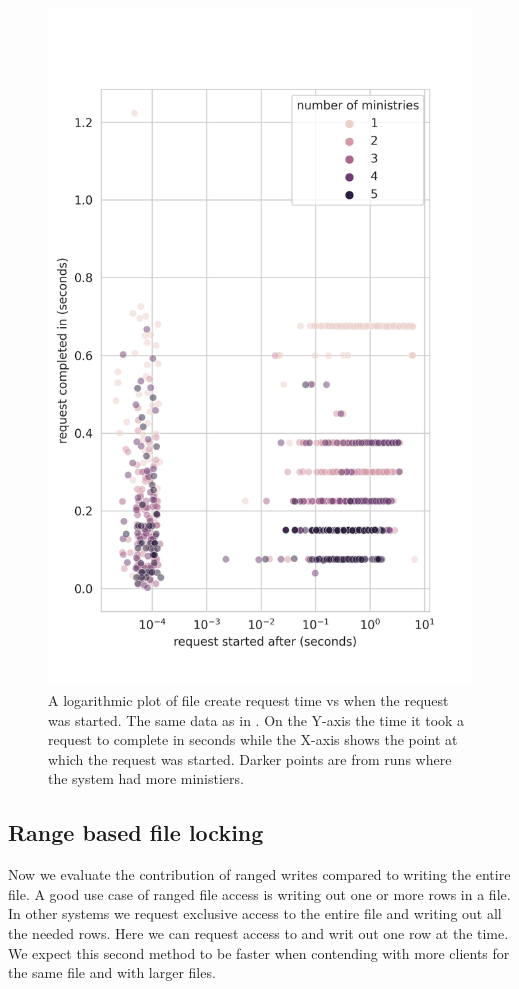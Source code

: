 \begin{figure}[bp]
	\centering
	\includegraphics[height=\textheight]{../results/plots/touch_vs_time.png}
	\caption{A logarithmic plot of file create request time vs when the request was started. The same data as in . On the Y-axis the time it took a request to complete in seconds while the X-axis shows the point at which the request was started. Darker points are from runs where the system had more ministiers.}
	\label{fig:touch_vs_time}
\end{figure}

\clearpage{}
\subsection{Range based file locking} \label{sec:res_range}
Now we evaluate the contribution of ranged writes compared to writing the entire file. A good use case of ranged file access is writing out one or more rows in a file. In other systems we request exclusive access to the entire file and writing out all the needed rows. Here we can request access to and writ out one row at the time. We expect this second method to be faster when contending with more clients for the same file and with larger files.

